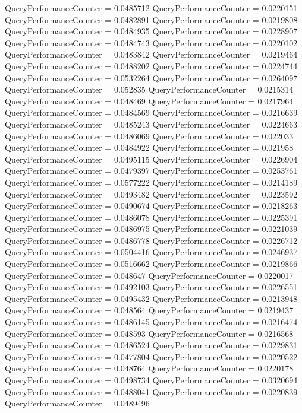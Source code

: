 \documentclass[9pt]{article}
\theoremstyle{plain}
\theoremstyle{definition}
\theoremstyle{remark}
\numberwithin{equation}{section}
\begin{document}
QueryPerformanceCounter  =  0.0485712
QueryPerformanceCounter  =  0.0220151
QueryPerformanceCounter  =  0.0482891
QueryPerformanceCounter  =  0.0219808
QueryPerformanceCounter  =  0.0484935
QueryPerformanceCounter  =  0.0228907
QueryPerformanceCounter  =  0.0484743
QueryPerformanceCounter  =  0.0220102
QueryPerformanceCounter  =  0.0483842
QueryPerformanceCounter  =  0.0219464
QueryPerformanceCounter  =  0.0488202
QueryPerformanceCounter  =  0.0224744
QueryPerformanceCounter  =  0.0532264
QueryPerformanceCounter  =  0.0264097
QueryPerformanceCounter  =  0.052835
QueryPerformanceCounter  =  0.0215314
QueryPerformanceCounter  =  0.048469
QueryPerformanceCounter  =  0.0217964
QueryPerformanceCounter  =  0.0484569
QueryPerformanceCounter  =  0.0216639
QueryPerformanceCounter  =  0.0485243
QueryPerformanceCounter  =  0.0224663
QueryPerformanceCounter  =  0.0486069
QueryPerformanceCounter  =  0.022033
QueryPerformanceCounter  =  0.0484922
QueryPerformanceCounter  =  0.021958
QueryPerformanceCounter  =  0.0495115
QueryPerformanceCounter  =  0.0226904
QueryPerformanceCounter  =  0.0479397
QueryPerformanceCounter  =  0.0253761
QueryPerformanceCounter  =  0.0577222
QueryPerformanceCounter  =  0.0214189
QueryPerformanceCounter  =  0.0493482
QueryPerformanceCounter  =  0.0223592
QueryPerformanceCounter  =  0.0490674
QueryPerformanceCounter  =  0.0218263
QueryPerformanceCounter  =  0.0486078
QueryPerformanceCounter  =  0.0225391
QueryPerformanceCounter  =  0.0486975
QueryPerformanceCounter  =  0.0221039
QueryPerformanceCounter  =  0.0486778
QueryPerformanceCounter  =  0.0226712
QueryPerformanceCounter  =  0.0504416
QueryPerformanceCounter  =  0.0246937
QueryPerformanceCounter  =  0.0516662
QueryPerformanceCounter  =  0.0219866
QueryPerformanceCounter  =  0.048647
QueryPerformanceCounter  =  0.0220017
QueryPerformanceCounter  =  0.0492103
QueryPerformanceCounter  =  0.0226551
QueryPerformanceCounter  =  0.0495432
QueryPerformanceCounter  =  0.0213948
QueryPerformanceCounter  =  0.048564
QueryPerformanceCounter  =  0.0219437
QueryPerformanceCounter  =  0.0486145
QueryPerformanceCounter  =  0.0216474
QueryPerformanceCounter  =  0.048593
QueryPerformanceCounter  =  0.0216568
QueryPerformanceCounter  =  0.0486524
QueryPerformanceCounter  =  0.0229831
QueryPerformanceCounter  =  0.0477804
QueryPerformanceCounter  =  0.0220522
QueryPerformanceCounter  =  0.048764
QueryPerformanceCounter  =  0.0220178
QueryPerformanceCounter  =  0.0498734
QueryPerformanceCounter  =  0.0320694
QueryPerformanceCounter  =  0.0488041
QueryPerformanceCounter  =  0.0220839
QueryPerformanceCounter  =  0.0489496
\end{document}
